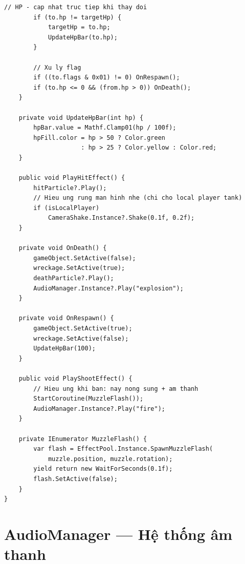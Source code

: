 \documentclass[12pt,a4paper]{report}
\begin{document}
\begin{lstlisting}[style=bashStyle, caption={Tank.cs --- animation track và hiệu ứng trúng đạn}, label={lst:tankvisual}]
        // HP - cap nhat truc tiep khi thay doi
        if (to.hp != targetHp) {
            targetHp = to.hp;
            UpdateHpBar(to.hp);
        }

        // Xu ly flag
        if ((to.flags & 0x01) != 0) OnRespawn();
        if (to.hp <= 0 && (from.hp > 0)) OnDeath();
    }

    private void UpdateHpBar(int hp) {
        hpBar.value = Mathf.Clamp01(hp / 100f);
        hpFill.color = hp > 50 ? Color.green
                     : hp > 25 ? Color.yellow : Color.red;
    }

    public void PlayHitEffect() {
        hitParticle?.Play();
        // Hieu ung rung man hinh nhe (chi cho local player tank)
        if (isLocalPlayer)
            CameraShake.Instance?.Shake(0.1f, 0.2f);
    }

    private void OnDeath() {
        gameObject.SetActive(false);
        wreckage.SetActive(true);
        deathParticle?.Play();
        AudioManager.Instance?.Play("explosion");
    }

    private void OnRespawn() {
        gameObject.SetActive(true);
        wreckage.SetActive(false);
        UpdateHpBar(100);
    }

    public void PlayShootEffect() {
        // Hieu ung khi ban: nay nong sung + am thanh
        StartCoroutine(MuzzleFlash());
        AudioManager.Instance?.Play("fire");
    }

    private IEnumerator MuzzleFlash() {
        var flash = EffectPool.Instance.SpawnMuzzleFlash(
            muzzle.position, muzzle.rotation);
        yield return new WaitForSeconds(0.1f);
        flash.SetActive(false);
    }
}
\end{lstlisting}

\section{AudioManager --- Hệ thống âm thanh}
\end{document}
